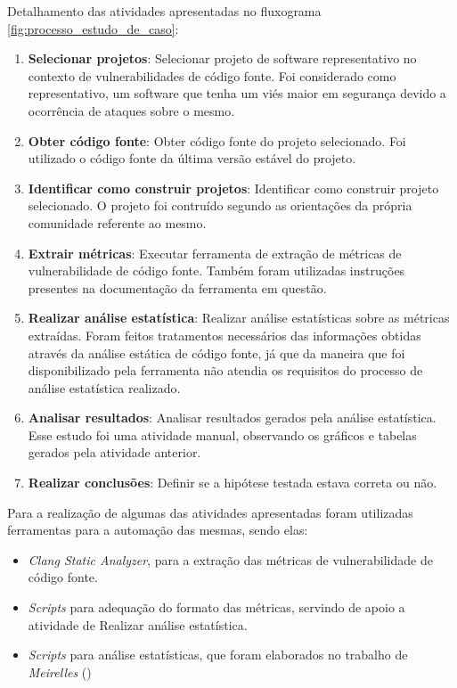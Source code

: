 Detalhamento das atividades apresentadas no fluxograma
\ref{fig:processo_estudo_de_caso}:

\begin{enumerate}\label{desc_processo}
  \item \textbf{Selecionar projetos}: Selecionar projeto de software representativo no contexto de
    vulnerabilidades de código fonte. Foi considerado como representativo, um
    software que tenha um viés maior em segurança devido a ocorrência de ataques
    sobre o mesmo.
  \item \textbf{Obter código fonte}: Obter código fonte do projeto selecionado. Foi utilizado o código fonte
  da última versão estável do projeto.
  \item \textbf{Identificar como construir projetos}: Identificar como construir projeto selecionado. O projeto foi contruído
    segundo as orientações da própria comunidade referente ao mesmo.
  \item \textbf{Extrair métricas}: Executar ferramenta de extração de métricas de vulnerabilidade de código
    fonte. Também foram utilizadas instruções presentes na documentação da
    ferramenta em questão.
  \item \textbf{Realizar análise estatística}: Realizar análise estatísticas sobre as métricas extraídas. Foram feitos
    tratamentos necessários das informações obtidas através da análise estática
    de código fonte, já que da maneira que foi disponibilizado pela ferramenta
    não atendia os requisitos do processo de análise estatística realizado.
  \item \textbf{Analisar resultados}: Analisar resultados gerados pela análise
    estatística. Esse estudo foi uma atividade
    manual, observando os gráficos e tabelas gerados pela atividade anterior.
  \item \textbf{Realizar conclusões}: Definir se a hipótese testada estava correta ou não.
\end{enumerate}

Para a realização de algumas das atividades apresentadas foram utilizadas
ferramentas para a automação das mesmas, sendo elas:

\begin{itemize}
  \item \textit{Clang Static Analyzer}, para a extração das métricas de
    vulnerabilidade de código fonte.
  \item \textit{Scripts} para adequação do formato das métricas, servindo de
    apoio a atividade de Realizar análise estatística.
  \item \textit{Scripts} para análise estatísticas, que foram elaborados no
    trabalho de \emph{Meirelles} (\citeyear{meirelles2013})
\end{itemize}

